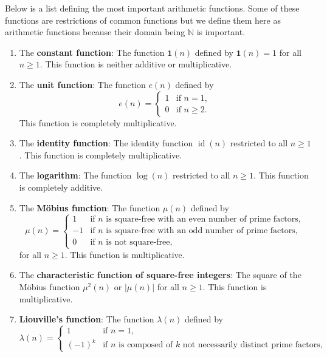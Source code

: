 \documentclass[12pt]{book}
\theoremstyle{definition}\newframedtheorem{method}{Method}
\newcommand{\N}{\mathbb{N}}
\renewcommand{\l}{\lambda}
\newcommand{\<}{\langle}
\renewcommand{\>}{\rangle}
\DeclareMathOperator{\id}{\textrm{id}}
\begin{document}
    Below is a list defining the most important arithmetic functions. Some of these functions are restrictions of common functions but we define them here as arithmetic functions because their domain being $\N$ is important.
    \begin{enumerate}[label=(\roman*)]
      \item The \textbf{constant function}: The function $\mathbf{1}(n)$ defined by $\mathbf{1}(n) = 1$ for all $n \ge 1$. This function is neither additive or multiplicative.
      \item The \textbf{unit function}: The function $e(n)$ defined by
      \[
        e(n) = \begin{cases} 1 & \text{if $n = 1$}, \\ 0 & \text{if $n \ge 2$}. \end{cases}
      \]
      This function is completely multiplicative.
      \item The \textbf{identity function}: The identity function $\id(n)$ restricted to all $n \ge 1$. This function is completely multiplicative.
      \item The \textbf{logarithm}: The function $\log(n)$ restricted to all $n \ge 1$. This function is completely additive.
      \item The \textbf{M\"obius function}: The function $\mu(n)$ defined by
      \[
        \mu(n) = \begin{cases} 1 & \text{if $n$ is square-free with an even number of prime factors}, \\ -1 & \text{if $n$ is square-free with an odd number of prime factors}, \\ 0 & \text{if $n$ is not square-free}, \end{cases}
      \]
      for all $n \ge 1$. This function is multiplicative.
      \item The \textbf{characteristic function of square-free integers}: The square of the M\"obius function $\mu^{2}(n)$ or $|\mu(n)|$ for all $n \ge 1$. This function is multiplicative.
      \item \textbf{Liouville's function}: The function $\l(n)$ defined by
      \[
        \l(n) = \begin{cases} 1 & \text{if $n = 1$}, \\ (-1)^{k} & \text{if $n$ is composed of $k$ not necessarily distinct prime factors}, \end{cases}
\]
\end{enumerate}
\end{document}
